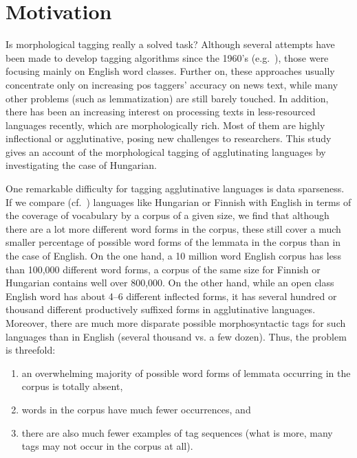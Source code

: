 \section{Motivation}

Is morphological tagging really a solved task? 
Although several attempts have been made to develop tagging algorithms since the 1960’s (e.g.~\cite{Stolz1965,Klein1963}), those were focusing mainly on English word classes. 
Further on, these approaches usually concentrate only on increasing \gls{pos} taggers’ accuracy on news text, while many other problems (such as lemmatization) are still barely touched. 
In addition, there has been an increasing interest on processing texts in less-resourced languages recently, which are morphologically rich. 
Most of them are highly inflectional or agglutinative, posing new challenges to researchers. This study gives an account of the morphological tagging of agglutinating languages by investigating the case of Hungarian. 

One remarkable difficulty for tagging agglutinative languages is data sparseness. If we compare (cf.~\cite{Oravecz2002a}) languages like Hungarian or Finnish with English in terms of the coverage of vocabulary by a corpus of a given size, we find that although there are a lot more different word forms in the corpus, these still cover a much smaller percentage of possible word forms of the lemmata in the corpus than in the case of English. 
On the one hand, a 10 million word English corpus has less than 100,000 different word forms, a corpus of the same size for Finnish or Hungarian contains well over 800,000. On the other hand, while an open class English word has about 4--6 different inflected forms, it has several hundred or thousand different productively suffixed forms in agglutinative languages. Moreover, there are much more disparate possible morphosyntactic tags for such languages than in English (several thousand vs. a few dozen). 
Thus, the problem is threefold:
\begin{enumerate}
  \item an overwhelming majority of possible word forms of lemmata occurring in the corpus is totally absent,
  \item words in the corpus have much fewer occurrences, and
  \item there are also much fewer examples of tag sequences (what is more, many tags may not occur in the corpus at all).
\end{enumerate}

